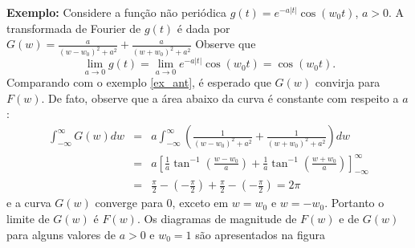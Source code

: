 \documentclass[a4paper,10pt]{book}
\begin{document}
{\bf Exemplo:} Considere a função não periódica $g(t)=e^{-a|t|}\cos(w_0 t)$, $a>0$. A transformada de Fourier de $g(t)$ é dada por $G(w)=\frac{a}{(w-w_0)^2+a^2}+\frac{a}{(w+w_0)^2+a^2}$  Observe que 
 \begin{equation}
 \lim_{a\to 0}g(t)=\lim_{a\to 0} e^{-a|t|}\cos(w_0 t)=\cos(w_0 t).
 \end{equation}
 Comparando com o exemplo \ref{ex_ant}, é esperado que $G(w)$ convirja para $F(w)$. De fato, observe que a área abaixo da curva é constante com respeito a $a$:
 \begin{eqnarray*}
 \int_{-\infty}^\infty G(w)dw&=&a\int_{-\infty}^\infty \left(\frac{1}{(w-w_0)^2+a^2}+\frac{1}{(w+w_0)^2+a^2}\right)dw\\
 &=&a\left[\frac{1}{a}\tan^{-1}\left(\frac{w-w_0}{a}\right)+\frac{1}{a}\tan^{-1}\left(\frac{w+w_0}{a}\right)\right]_{-\infty}^\infty\\
 &=&\frac{\pi}{2}-\left(-\frac{\pi}{2}\right)+\frac{\pi}{2}-\left(-\frac{\pi}{2}\right)=2\pi
 \end{eqnarray*}
 e a curva $G(w)$ converge para 0, exceto em $w=w_0$ e $w=-w_0$. Portanto o limite de $G(w)$ é $F(w)$. Os diagramas de magnitude de $F(w)$ e de $G(w)$ para alguns valores de $a>0$ e $w_0=1$ são apresentados na figura
\end{document}
